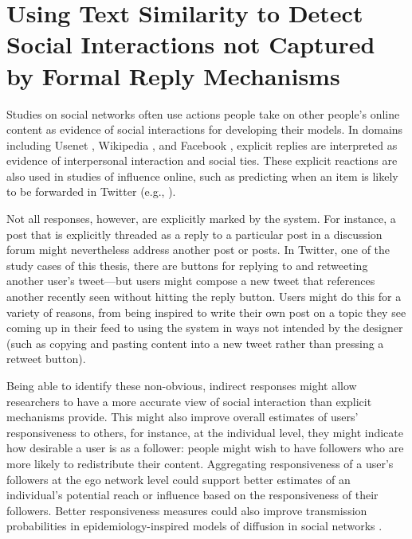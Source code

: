 \chapter{Using Text Similarity to Detect Social Interactions not Captured by Formal Reply Mechanisms}
\label{ch:reactions}

Studies on social networks often use actions people take on other people's online content as evidence of social interactions for developing their models. In domains including Usenet \cite{Joyce2006}, Wikipedia \cite{Black2011}, and Facebook \cite{Gilbert2009}, explicit replies are interpreted as evidence of interpersonal interaction and social ties.  These explicit reactions are also used in studies of influence online, such as predicting when an item is likely to be forwarded in Twitter (e.g., \cite{Suh2010,Comarela2012}).

Not all responses, however, are explicitly marked by the system.  For instance, a post that is explicitly threaded as a reply to a particular post in a discussion forum might nevertheless address another post or posts.  In Twitter, one of the study cases of this thesis, there are buttons for replying to and retweeting another user's tweet---but users might compose a new tweet that references another recently seen without hitting the reply button.  Users might do this for a variety of reasons, from being inspired to write their own post on a topic they see coming up in their feed to using the system in ways not intended by the designer (such as copying and pasting content into a new tweet rather than pressing a retweet button).  

Being able to identify these non-obvious, indirect responses might allow researchers to have a more accurate view of social interaction than explicit mechanisms provide.  This might also improve overall estimates of users' responsiveness to others, for instance,
at the individual level, they might indicate how desirable a user is as a follower: people might wish to have followers who are more likely to redistribute their content.  Aggregating responsiveness of a user's followers at the ego network level could support better estimates of an individual's potential reach or influence \cite{Domingos2001} based on the responsiveness of their followers.  Better responsiveness measures could also improve transmission probabilities in epidemiology-inspired models of diffusion in social networks \cite{Bakshy2012a}. 

